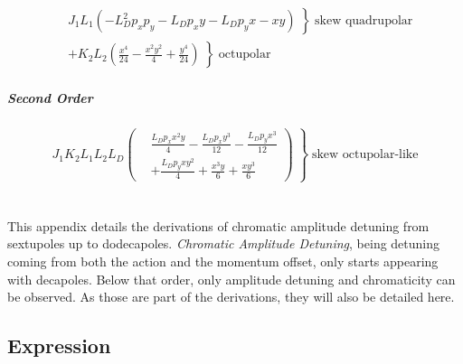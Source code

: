 \begin{equation}
  \begin{aligned}
    &\left. J_{1} L_{1} \left(- L_{D}^{2} p_{x} p_{y} - L_{D} p_{x} y - L_{D} p_{y} x - x y\right) \; \right\} \; \text{skew quadrupolar}\\
    &\left. + K_{2} L_{2} \left(\frac{x^{4}}{24} - \frac{x^{2} y^{2}}{4} + \frac{y^{4}}{24}\right) \; \right\} \; \text{octupolar}
  \end{aligned}
\end{equation}


\paragraph{Second Order}

\begin{equation}
  \left. J_{1} K_{2} L_{1} L_{2} L_{D} \left(
  \begin{aligned}
      &\frac{L_{D} p_{x} x^{2} y}{4} - \frac{L_{D} p_{x} y^{3}}{12} - \frac{L_{D} p_{y} x^{3}}{12} \\
      &+ \frac{L_{D} p_{y} x y^{2}}{4} + \frac{x^{3} y}{6} + \frac{x y^{3}}{6}
  \end{aligned}
  \right) \; \right\} \; \text{skew octupolar-like}
\end{equation}




\chapter{}
\label{appendix:chromatic_amplitude_detuning}
\thumbforappendix

This appendix details the derivations of chromatic amplitude detuning from sextupoles up to
dodecapoles. 
\textit{Chromatic Amplitude Detuning}, being detuning coming from both the action and the momentum
offset, only starts appearing with decapoles. Below that order, only amplitude detuning and
chromaticity can be observed. As those are part of the derivations, they will also be detailed here.


\section{Expression}

